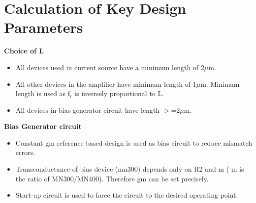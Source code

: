 \documentclass[12pt,a4paper]{article}
\begin{document}

\pagebreak



\section{Calculation of Key Design Parameters}

\textbf{Choice of L}

\begin{itemize}
\item All devices used in current source have a minimum length of 2$\mu$m.
\item All other devices in the amplifier have minimum length of 1$\mu$m. 
Minimum length is used as f$_{t }$ is inversely proportional to L.
\item All devices in bias generator circuit have length $>$=2$\mu$m.
\end{itemize}


\textbf{Bias Generator circuit}

\begin{itemize}
\item Constant gm reference based design is used as bias circuit to 
reduce mismatch errors.
\item Transconductance of bias device (mn300) depends only on R2 and m ( 
m is the ratio of MN300/MN400). Therefore gm can be set precisely.
\item Start-up circuit is used to force the circuit to the desired 
operating point.
\end{itemize}
\end{document}
